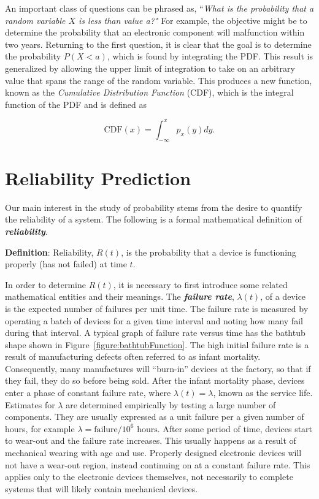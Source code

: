 {An important class of questions can be phrased as, ``\emph{What is the
probability that a random variable $X$ is less than value a?"} For
example, the objective might be to determine the probability that an
electronic component will malfunction within two years. Returning to the
first question, it is clear that the goal is to determine the
probability $P(X<a)$, which is found by
integrating the PDF. This result is generalized by allowing the upper
limit of integration to take on an arbitrary value that spans the range
of the random variable. This produces a new function, known as the
\emph{Cumulative Distribution Function} (CDF), which is the integral
function of the PDF and is defined as

\begin{equation}
\label{equ:exponentialDensity}
\text{CDF}(x) = \int^x_{-\infty} p_x(y)dy.
\end{equation}

\section{Reliability Prediction}
\label{section:reliability-prediction}

Our main interest in the study of probability stems from the desire to
quantify the reliability of a system. The following is a formal
mathematical definition of \emph{\textbf{reliability}}.

\begin{itquote}
\textbf{Definition}: Reliability, $R(t)$, is the probability that a
device is functioning properly (has not failed) at time $t$.
\end{itquote}

In order to determine $R(t)$, it is necessary to first introduce
some related mathematical entities and their meanings. The
\emph{\textbf{failure rate}}, $\lambda(t)$, of a device is the expected
number of failures per unit time. The failure rate is measured by
operating a batch of devices for a given time interval and noting how
many fail during that interval. A typical graph of failure rate versus
time has the bathtub shape shown in Figure~\ref{figure:bathtubFunction}. 
The high initial failure
rate is a result of manufacturing defects often referred to as infant
mortality. Consequently, many manufactures will ``burn-in'' devices at
the factory, so that if they fail, they do so before being sold. After
the infant mortality phase, devices enter a phase of constant failure
rate, where $\lambda(t) = \lambda$, known as the service life. Estimates for
$\lambda$ are determined empirically by testing a large number of
components. They are usually expressed as a unit failure per a given
number of hours, for example $\lambda  = \text{failure}/10^6 \text{ hours}$.
After some period of time, devices start to wear-out and the failure
rate increases. This usually happens as a result of mechanical wearing
with age and use. Properly designed electronic devices will not have a
wear-out region, instead continuing on at a constant failure rate. This
applies only to the electronic devices themselves, not necessarily to
complete systems that will likely contain mechanical devices.

}
